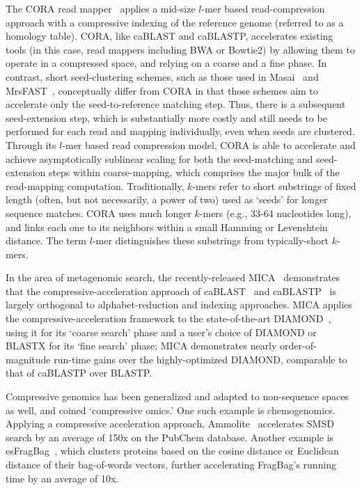 \documentclass{acm_proc_article-sp}
\begin{document}
The CORA read mapper~\cite{yorukoglu2015compressive} applies a mid-size $l$-mer based 
read-compression approach with a compressive indexing of the reference genome
(referred to as a homology table).
CORA, like caBLAST and caBLASTP, accelerates existing tools (in this case, read
mappers including BWA or Bowtie2) by allowing them to operate in a compressed
space, and relying on a coarse and a fine phase.
In contrast, short seed-clustering schemes, such as those used in Masai~\cite{siragusa2013fast} and 
MrsFAST~\cite{berger2013computational}, conceptually differ from CORA in that those 
schemes aim to accelerate only the seed-to-reference matching step.
Thus, there is a subsequent seed-extension step, which is substantially more 
costly and still needs to be performed for each read and mapping individually, 
even when seeds are clustered. 
Through its $l$-mer based read compression model, CORA is able to accelerate 
and 
achieve asymptotically sublinear scaling for both the seed-matching and 
seed-extension steps within coarse-mapping, which comprises the major bulk of 
the read-mapping computation.
Traditionally, $k$-mers refer to short substrings of fixed length (often, but 
not necessarily, a power of two) used as `seeds' for longer sequence matches.
CORA uses much longer $k$-mers (e.g., 33-64 nucleotides long), and links each 
one to its neighbors within a small Hamming or Levenshtein distance.
The term $l$-mer distinguishes these substrings from typically-short $k$-mers.

In the area of metagenomic search,
the recently-released MICA~\cite{yu2015entropy} demonstrates that the 
compressive-acceleration approach of 
caBLAST~\cite{loh2012compressive} and caBLASTP~\cite{daniels2013compressive} is 
largely orthogonal to alphabet-reduction and indexing approaches.
MICA applies the compressive-acceleration framework to the
state-of-the-art DIAMOND~\cite{buchfink2014fast}, using it
for its `coarse search' phase and a user's choice of DIAMOND or BLASTX for its
`fine search' phase; MICA demonstrates nearly order-of-magnitude run-time gains over the highly-optimized DIAMOND, comparable to that of caBLASTP over BLASTP.

Compressive genomics \cite{loh2012compressive} has been
generalized and adapted to non-sequence spaces as well, and coined
`compressive omics.'
One such example is chemogenomics.
Applying a compressive acceleration approach, Ammolite~\cite{yu2015entropy}
accelerates SMSD search by an average of 150x on the PubChem database.
Another example is 
esFragBag~\cite{yu2015entropy}, which clusters proteins based on the cosine distance or
Euclidean distance of their bag-of-words vectors, further accelerating FragBag's
running time by an average of 10x.
\end{document}
